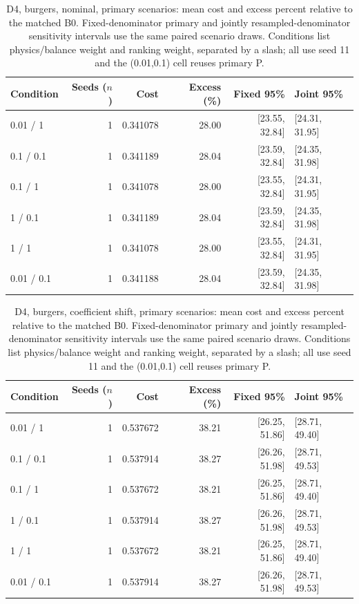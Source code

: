 \begin{table}[ht]
\centering\small
\caption{D4, burgers, nominal, primary scenarios: mean cost and excess percent relative to the matched B0. Fixed-denominator primary and jointly resampled-denominator sensitivity intervals use the same paired scenario draws. Conditions list physics/balance weight and ranking weight, separated by a slash; all use seed 11 and the (0.01,0.1) cell reuses primary P.}\label{tab:revision_cost_E4_burgers_locked_nominal}
\begin{tabular}{@{}lrrrrl@{}}\toprule
Condition & Seeds ($n$) & Cost & Excess (\%) & Fixed 95\% & Joint 95\%\\\midrule
0.01 / 1 & 1 & 0.341078 & 28.00 & [23.55, 32.84] & [24.31, 31.95]\\
0.1 / 0.1 & 1 & 0.341189 & 28.04 & [23.59, 32.84] & [24.35, 31.98]\\
0.1 / 1 & 1 & 0.341078 & 28.00 & [23.55, 32.84] & [24.31, 31.95]\\
1 / 0.1 & 1 & 0.341189 & 28.04 & [23.59, 32.84] & [24.35, 31.98]\\
1 / 1 & 1 & 0.341078 & 28.00 & [23.55, 32.84] & [24.31, 31.95]\\
0.01 / 0.1 & 1 & 0.341188 & 28.04 & [23.59, 32.84] & [24.35, 31.98]\\
\bottomrule\end{tabular}
\end{table}

\begin{table}[ht]
\centering\small
\caption{D4, burgers, coefficient shift, primary scenarios: mean cost and excess percent relative to the matched B0. Fixed-denominator primary and jointly resampled-denominator sensitivity intervals use the same paired scenario draws. Conditions list physics/balance weight and ranking weight, separated by a slash; all use seed 11 and the (0.01,0.1) cell reuses primary P.}\label{tab:revision_cost_E4_burgers_locked_coefficient_ood}
\begin{tabular}{@{}lrrrrl@{}}\toprule
Condition & Seeds ($n$) & Cost & Excess (\%) & Fixed 95\% & Joint 95\%\\\midrule
0.01 / 1 & 1 & 0.537672 & 38.21 & [26.25, 51.86] & [28.71, 49.40]\\
0.1 / 0.1 & 1 & 0.537914 & 38.27 & [26.26, 51.98] & [28.71, 49.53]\\
0.1 / 1 & 1 & 0.537672 & 38.21 & [26.25, 51.86] & [28.71, 49.40]\\
1 / 0.1 & 1 & 0.537914 & 38.27 & [26.26, 51.98] & [28.71, 49.53]\\
1 / 1 & 1 & 0.537672 & 38.21 & [26.25, 51.86] & [28.71, 49.40]\\
0.01 / 0.1 & 1 & 0.537914 & 38.27 & [26.26, 51.98] & [28.71, 49.53]\\
\bottomrule\end{tabular}
\end{table}

